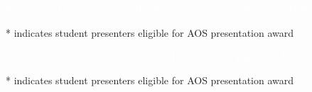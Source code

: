 \documentclass[twoside]{article}
\begin{document}

\thispagestyle{empty}
\pagestyle{fancy}

\setlength{\parindent}{0cm}

\newcommand\posterentry[3]{%
	\begin{minipage}{\linewidth}
	\raggedright
	#1 \textbf{#2} \\ #3 \\
	\vspace{8pt}
	\end{minipage}
}

\begin{shaded}
\Huge{\textcolor{white}{Wednesday Poster Session \normalsize 7:30--9:30 PM La Perouse - Explorers Hall}}
\end{shaded}

* indicates student presenters eligible for AOS presentation award
 
\begin{multicols}{2}

\normalsize


\end{multicols}

\newpage

\begin{shaded}
\Huge{\textcolor{white}{Thursday Poster Session \normalsize 7:30--9:30 PM La Perouse - Explorers Hall}}
\end{shaded}

* indicates student presenters eligible for AOS presentation award

\begin{multicols}{2}

\normalsize


\end{multicols}

%
\end{document}
